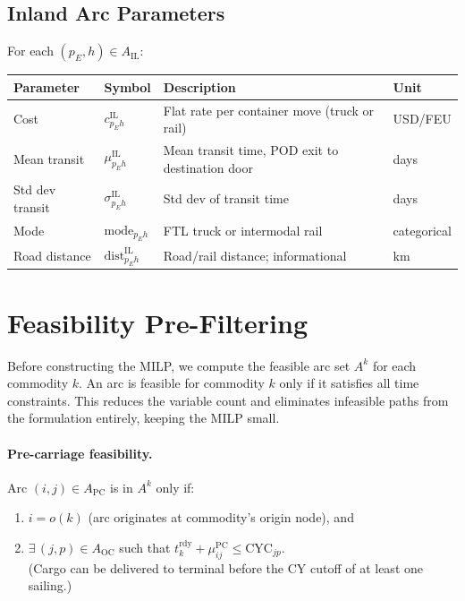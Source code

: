 \documentclass[11pt,a4paper]{article}
\theoremstyle{definition}
\begin{document}
\subsection{Inland Arc Parameters}

For each $(p_E, h) \in A_{\text{IL}}$:

\begin{center}
\begin{tabular}{llp{5.5cm}l}
\toprule
Parameter & Symbol & Description & Unit \\
\midrule
Cost & $c_{p_E h}^{\text{IL}}$ & Flat rate per container move (truck or rail) & USD/FEU \\
Mean transit & $\mu_{p_E h}^{\text{IL}}$ & Mean transit time, POD exit to destination door & days \\
Std dev transit & $\sigma_{p_E h}^{\text{IL}}$ & Std dev of transit time & days \\
Mode & $\text{mode}_{p_E h}$ & FTL truck or intermodal rail & categorical \\
Road distance & $\text{dist}_{p_E h}^{\text{IL}}$ & Road/rail distance; informational & km \\
\bottomrule
\end{tabular}
\end{center}

\section{Feasibility Pre-Filtering}
\label{sec:prefilter}

Before constructing the MILP, we compute the feasible arc set $A^k$ for each
commodity $k$. An arc is feasible for commodity $k$ only if it satisfies all time
constraints. This reduces the variable count and eliminates infeasible paths from
the formulation entirely, keeping the MILP small.

\paragraph{Pre-carriage feasibility.}
Arc $(i, j) \in A_{\text{PC}}$ is in $A^k$ only if:
\begin{enumerate}[noitemsep]
  \item $i = o(k)$ \quad (arc originates at commodity's origin node), and
  \item $\exists\, (j, p) \in A_{\text{OC}}$ such that $t_k^{\text{rdy}} + \mu_{ij}^{\text{PC}} \leq \text{CYC}_{jp}$. \\
        (Cargo can be delivered to terminal before the CY cutoff of at least one sailing.)
\end{enumerate}
\end{document}
